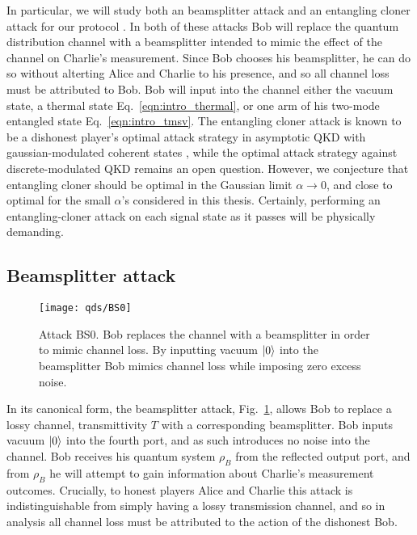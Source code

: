 

In particular, we will study both an beamsplitter attack and an entangling cloner attack for our protocol \cite{Grosshans2002, Grosshans2003}. In both of these attacks Bob will replace the quantum distribution channel with a beamsplitter intended to mimic the effect of the channel on Charlie's measurement. Since Bob chooses his beamsplitter, he can do so without alterting Alice and Charlie to his presence, and so all channel loss must be attributed to Bob. Bob will input into the channel either the vacuum state, a thermal state Eq.~\ref{eqn:intro_thermal}, or one arm of his two-mode entangled state Eq.~\ref{eqn:intro_tmsv}. The entangling cloner attack is known to be a dishonest player's optimal attack strategy in asymptotic QKD with gaussian-modulated coherent states \cite{Lodewyck2007, Laudenbach2017}, while the optimal attack strategy against discrete-modulated QKD remains an open question. However, we conjecture that entangling cloner should be optimal in the Gaussian limit $\alpha \rightarrow 0$, and close to optimal for the small $\alpha$'s considered in this thesis. Certainly, performing an entangling-cloner attack on each signal state as it passes will be physically demanding.

\subsection{Beamsplitter attack}

\begin{figure}[htp]
\centering
\texttt{[image: qds/BS0]}
\caption{\label{fig:bs0_attack} Attack BS$0$. Bob replaces the channel with a beamsplitter in order to mimic channel loss. By inputting vacuum $\ket{0}$ into the beamsplitter Bob mimics channel loss while imposing zero excess noise.}
\end{figure}
In its canonical form, the beamsplitter attack, Fig.~\ref{fig:bs0_attack}, allows Bob to replace a lossy channel, transmittivity $T$ with a corresponding beamsplitter. Bob inputs vacuum $\ket{0}$ into the fourth port, and as such introduces no noise into the channel. Bob receives his quantum system $\rho_B$ from the reflected output port, and from $\rho_B$ he will attempt to gain information about Charlie's measurement outcomes. Crucially, to honest players Alice and Charlie this attack is indistinguishable from simply having a lossy transmission channel, and so in analysis all channel loss must be attributed to the action of the dishonest Bob. 

